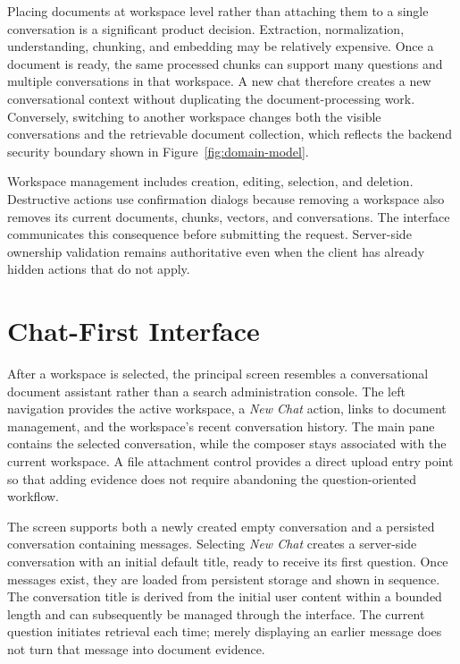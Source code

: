 Placing documents at workspace level rather than attaching them to a single conversation is a significant product decision. Extraction, normalization, understanding, chunking, and embedding may be relatively expensive. Once a document is ready, the same processed chunks can support many questions and multiple conversations in that workspace. A new chat therefore creates a new conversational context without duplicating the document-processing work. Conversely, switching to another workspace changes both the visible conversations and the retrievable document collection, which reflects the backend security boundary shown in Figure~\ref{fig:domain-model}.

Workspace management includes creation, editing, selection, and deletion. Destructive actions use confirmation dialogs because removing a workspace also removes its current documents, chunks, vectors, and conversations. The interface communicates this consequence before submitting the request. Server-side ownership validation remains authoritative even when the client has already hidden actions that do not apply.

\section{Chat-First Interface}
\label{sec:chat-first-interface}

After a workspace is selected, the principal screen resembles a conversational document assistant rather than a search administration console. The left navigation provides the active workspace, a \emph{New Chat} action, links to document management, and the workspace's recent conversation history. The main pane contains the selected conversation, while the composer stays associated with the current workspace. A file attachment control provides a direct upload entry point so that adding evidence does not require abandoning the question-oriented workflow.

The screen supports both a newly created empty conversation and a persisted conversation containing messages. Selecting \emph{New Chat} creates a server-side conversation with an initial default title, ready to receive its first question. Once messages exist, they are loaded from persistent storage and shown in sequence. The conversation title is derived from the initial user content within a bounded length and can subsequently be managed through the interface. The current question initiates retrieval each time; merely displaying an earlier message does not turn that message into document evidence.

